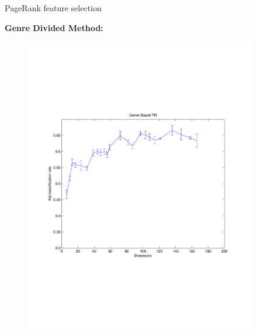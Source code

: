 \documentclass[xcolor=dvipsnames,t]{beamer} %
\begin{document}
\begin{frame}{PageRank feature selection}

\textbf{Genre Divided Method:}
\vspace{-1in}
\begin{figure}
\centering
\includegraphics[width=0.9\textwidth]{figures/genrePR.pdf}
\end{figure}

\end{frame}

\end{document}
